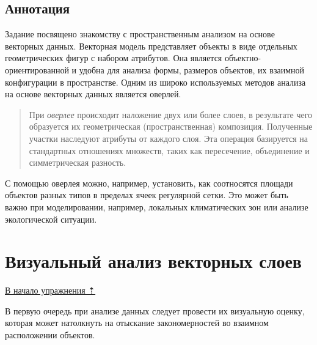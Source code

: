 \documentclass[
  12pt,
]{book}
\begin{document}
\hypertarget{spatrelations-annotation}{%
\subsection{Аннотация}\label{spatrelations-annotation}}

Задание посвящено знакомству с пространственным анализом на основе векторных данных. Векторная модель представляет объекты в виде отдельных геометрических фигур с набором атрибутов. Она является объектно-ориентированной и удобна для анализа формы, размеров объектов, их взаимной конфигурации в пространстве. Одним из широко используемых методов анализа на основе векторных данных является оверлей.

\begin{quote}
При \emph{оверлее} происходит наложение двух или более слоев, в результате чего образуется их геометрическая (пространственная) композиция. Полученные участки наследуют атрибуты от каждого слоя. Эта операция базируется на стандартных отношениях множеств, таких как пересечение, объединение и симметрическая разность.
\end{quote}

С помощью оверлея можно, например, установить, как соотносятся площади объектов разных типов в пределах ячеек регулярной сетки. Это может быть важно при моделировании, например, локальных климатических зон или анализе экологической ситуации.

\hypertarget{spatrelations-vizual}{%
\section{Визуальный анализ векторных слоев}\label{spatrelations-vizual}}

\protect\hyperlink{spatrelations}{В начало упражнения ⇡}

В первую очередь при анализе данных следует провести их визуальную оценку, которая может натолкнуть на отыскание закономерностей во взаимном расположении объектов.
\end{document}

